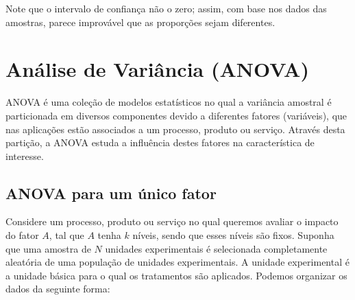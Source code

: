 \documentclass[
]{book}
\begin{document}
Note que o intervalo de confiança não o zero; assim, com base nos dados das amostras, parece improvável que as proporções sejam diferentes.

\hypertarget{anuxe1lise-de-variuxe2ncia-anova}{%
\chapter{Análise de Variância (ANOVA)}\label{anuxe1lise-de-variuxe2ncia-anova}}

ANOVA é uma coleção de modelos estatísticos no qual a variância amostral é particionada em diversos componentes devido a diferentes fatores (variáveis), que nas aplicações estão associados a um processo, produto ou serviço. Através desta partição, a ANOVA estuda a influência destes fatores na característica de interesse.

\hypertarget{anova-para-um-uxfanico-fator}{%
\section{ANOVA para um único fator}\label{anova-para-um-uxfanico-fator}}

Considere um processo, produto ou serviço no qual queremos avaliar o impacto do fator \(A\), tal que \(A\) tenha \(k\) níveis, sendo que esses níveis são fixos. Suponha que uma amostra de \(N\) unidades experimentais é selecionada completamente aleatória de uma população de unidades experimentais. A unidade experimental é a unidade básica para o qual os tratamentos são aplicados. Podemos organizar os dados da seguinte forma:
\end{document}
